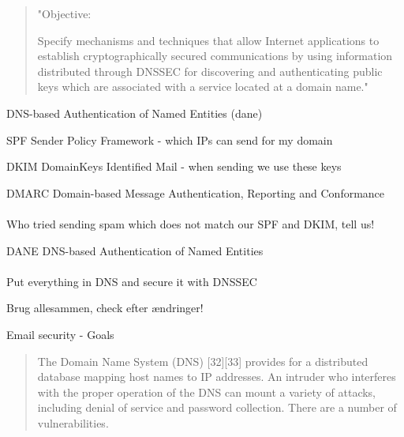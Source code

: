 \documentclass[Screen16to9,17pt]{foils}
\begin{document}

\begin{quote}
"Objective:

Specify mechanisms and techniques that allow Internet applications to
establish cryptographically secured communications by using information
distributed through DNSSEC for discovering and authenticating public
keys which are associated with a service located at a domain name."
\end{quote}

\begin{list1}
\item DNS-based Authentication of Named Entities (dane)
\end{list1}




\begin{list2}
\item SPF Sender Policy Framework - which IPs can send for my domain\\ {\footnotesize{}}
\item DKIM DomainKeys Identified Mail - when sending we use these keys\\
{\footnotesize{}}
\item DMARC Domain-based Message Authentication, Reporting and Conformance\\
{\footnotesize{}}\\
Who tried sending spam which does not match our SPF and DKIM, tell us!
\item DANE DNS-based Authentication of Named Entities\\ {\footnotesize{}}\\
Put everything in DNS and secure it with DNSSEC
\item Brug allesammen, check efter ændringer!
\end{list2}

\vskip 1cm
\centerline{\hlkbig Email security \the\year - Goals}


\begin{quote}
The Domain Name System (DNS) [32][33] provides for a distributed database mapping host names to IP
addresses. An intruder who interferes with the proper operation of the DNS can mount a variety of
attacks, including denial of service and password collection. There are a number of vulnerabilities.
\end{quote}
\end{document}
